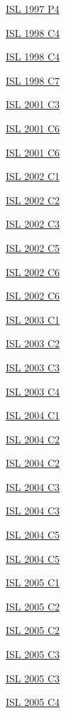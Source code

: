 \hyperref  [problem:ISL 1997 P4]{ISL 1997 P4}

\hyperref  [problem:ISL 1998 C4]{ISL 1998 C4}

\hyperref  [problem:ISL 1998 C4]{ISL 1998 C4}

\hyperref  [problem:ISL 1998 C7]{ISL 1998 C7}

\hyperref  [problem:ISL 2001 C3]{ISL 2001 C3}

\hyperref  [problem:ISL 2001 C6]{ISL 2001 C6}

\hyperref  [problem:ISL 2001 C6]{ISL 2001 C6}

\hyperref  [problem:ISL 2002 C1]{ISL 2002 C1}

\hyperref  [problem:ISL 2002 C2]{ISL 2002 C2}

\hyperref  [problem:ISL 2002 C3]{ISL 2002 C3}

\hyperref  [problem:ISL 2002 C5]{ISL 2002 C5}

\hyperref  [problem:ISL 2002 C6]{ISL 2002 C6}

\hyperref  [problem:ISL 2002 C6]{ISL 2002 C6}

\hyperref  [problem:ISL 2003 C1]{ISL 2003 C1}

\hyperref  [problem:ISL 2003 C2]{ISL 2003 C2}

\hyperref  [problem:ISL 2003 C3]{ISL 2003 C3}

\hyperref  [problem:ISL 2003 C4]{ISL 2003 C4}

\hyperref  [problem:ISL 2004 C1]{ISL 2004 C1}

\hyperref  [problem:ISL 2004 C2]{ISL 2004 C2}

\hyperref  [problem:ISL 2004 C2]{ISL 2004 C2}

\hyperref  [problem:ISL 2004 C3]{ISL 2004 C3}

\hyperref  [problem:ISL 2004 C3]{ISL 2004 C3}

\hyperref  [problem:ISL 2004 C5]{ISL 2004 C5}

\hyperref  [problem:ISL 2004 C5]{ISL 2004 C5}

\hyperref  [problem:ISL 2005 C1]{ISL 2005 C1}

\hyperref  [problem:ISL 2005 C2]{ISL 2005 C2}

\hyperref  [problem:ISL 2005 C2]{ISL 2005 C2}

\hyperref  [problem:ISL 2005 C3]{ISL 2005 C3}

\hyperref  [problem:ISL 2005 C3]{ISL 2005 C3}

\hyperref  [problem:ISL 2005 C4]{ISL 2005 C4}

